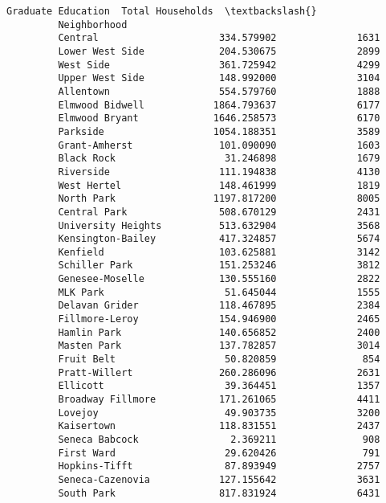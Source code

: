 \documentclass[11pt]{article}
\begin{document}
\begin{Verbatim}[commandchars=\\\{\}]
                             Graduate Education  Total Households  \textbackslash{}
         Neighborhood                                               
         Central                     334.579902              1631   
         Lower West Side             204.530675              2899   
         West Side                   361.725942              4299   
         Upper West Side             148.992000              3104   
         Allentown                   554.579760              1888   
         Elmwood Bidwell            1864.793637              6177   
         Elmwood Bryant             1646.258573              6170   
         Parkside                   1054.188351              3589   
         Grant-Amherst               101.090090              1603   
         Black Rock                   31.246898              1679   
         Riverside                   111.194838              4130   
         West Hertel                 148.461999              1819   
         North Park                 1197.817200              8005   
         Central Park                508.670129              2431   
         University Heights          513.632904              3568   
         Kensington-Bailey           417.324857              5674   
         Kenfield                    103.625881              3142   
         Schiller Park               151.253246              3812   
         Genesee-Moselle             130.555160              2822   
         MLK Park                     51.645044              1555   
         Delavan Grider              118.467895              2384   
         Fillmore-Leroy              154.946900              2465   
         Hamlin Park                 140.656852              2400   
         Masten Park                 137.782857              3014   
         Fruit Belt                   50.820859               854   
         Pratt-Willert               260.286096              2631   
         Ellicott                     39.364451              1357   
         Broadway Fillmore           171.261065              4411   
         Lovejoy                      49.903735              3200   
         Kaisertown                  118.831551              2437   
         Seneca Babcock                2.369211               908   
         First Ward                   29.620426               791   
         Hopkins-Tifft                87.893949              2757   
         Seneca-Cazenovia            127.155642              3631   
         South Park                  817.831924              6431   
         

\end{Verbatim}
\end{document}
